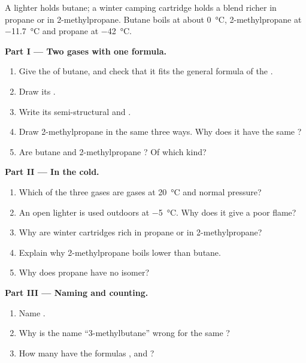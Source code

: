 \begin{problem}
\label{pb:g11:organic-skeletons:1}
A lighter holds butane; a winter camping cartridge holds a blend richer
in propane or in 2-methylpropane. Butane boils at about
\qty{0}{\celsius}, 2-methylpropane at \qty{-11.7}{\celsius} and propane
at \qty{-42}{\celsius}.

\medskip
\noindent\textbf{Part I --- Two gases with one formula.}
\begin{enumerate}
  \item Give the  of butane, and check that it fits the
        general formula of the .
  \item Draw its .
  \item Write its semi-structural and .
  \item Draw 2-methylpropane in the same three ways. Why does it have
        the same ?
  \item Are butane and 2-methylpropane ? Of which kind?
\end{enumerate}

\medskip
\noindent\textbf{Part II --- In the cold.}
\begin{enumerate}[resume]
  \item Which of the three gases are gases at \qty{20}{\celsius} and
        normal pressure?
  \item An open lighter is used outdoors at \qty{-5}{\celsius}. Why
        does it give a poor flame?
  \item Why are winter cartridges rich in propane or in 2-methylpropane?
  \item Explain why 2-methylpropane boils lower than butane.
  \item Why does propane have no isomer?
\end{enumerate}

\medskip
\noindent\textbf{Part III --- Naming and counting.}
\begin{enumerate}[resume]
  \item Name .
  \item Why is the name ``3-methylbutane'' wrong for the same ?
  \item How many   have the formulas ,
         and ?
\end{enumerate}


\end{problem}
